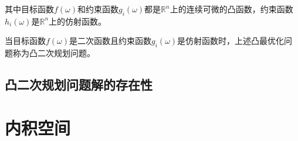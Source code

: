其中目标函数$f(\omega)$和约束函数$g_i(\omega)$都是$\mathbb{R}^n$上的连续可微的凸函数，约束函数
$h_i(\omega)$是$\mathbb{R}^n$上的仿射函数。

当目标函数$f(\omega)$是二次函数且约束函数$g_i(\omega)$是仿射函数时，上述凸最优化问题称为凸二次规划问题。

\section{凸二次规划问题解的存在性}

\chapter{内积空间}